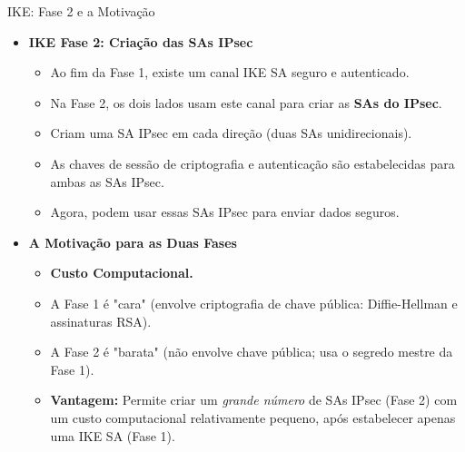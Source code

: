 \begin{frame}{IKE: Fase 2 e a Motivação}
    \begin{itemize}
        \item \textbf{IKE Fase 2: Criação das SAs IPsec}
              \begin{itemize}
                  \item Ao fim da Fase 1, existe um canal IKE SA seguro e autenticado.
                  \item Na Fase 2, os dois lados usam este canal para criar as \textbf{SAs do IPsec}.
                  \item Criam uma SA IPsec em cada direção (duas SAs unidirecionais).
                  \item As chaves de sessão de criptografia e autenticação são estabelecidas para ambas as SAs IPsec.
                  \item Agora, podem usar essas SAs IPsec para enviar dados seguros.
              \end{itemize}

        \item \textbf{A Motivação para as Duas Fases}
              \begin{itemize}
                  \item \textbf{Custo Computacional.}
                  \item A Fase 1 é "cara" (envolve criptografia de chave pública: Diffie-Hellman e assinaturas RSA).
                  \item A Fase 2 é "barata" (não envolve chave pública; usa o segredo mestre da Fase 1).
                  \item \textbf{Vantagem:} Permite criar um \textit{grande número} de SAs IPsec (Fase 2) com um custo computacional relativamente pequeno, após estabelecer apenas uma IKE SA (Fase 1).
              \end{itemize}
    \end{itemize}
\end{frame}


